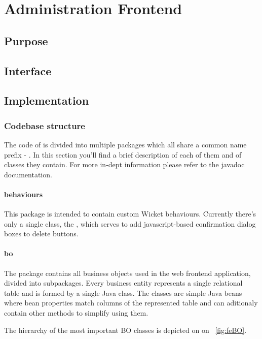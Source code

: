 \chapter{Administration Frontend}
\section{Purpose}
\section{Interface}
\section{Implementation}

\subsection{Codebase structure}

The code of \FE is divided into multiple packages which all share a common name prefix - . In this section you'll find a brief description of each of them and of classes they contain. For more in-dept information please refer to the javadoc documentation.

\subsubsection{behaviours}

This package is intended to contain custom Wicket behaviours. Currently there's only a single class, the , which serves to add javascript-based confirmation dialog boxes to delete buttons.

\subsubsection{bo}

The  package contains all business objects used in the web frontend application, divided into subpackages. Every business entity represents a single relational table and is formed by a single Java class. The classes are simple Java beans where bean properties match columns of the represented table and can aditionaly contain other methods to simplify using them.

The hierarchy of the most important BO classes is depicted on on \figurename~\ref{fig:feBO}.

